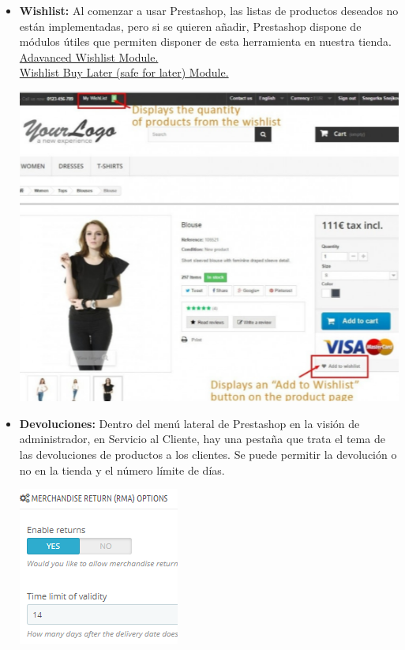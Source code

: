 \documentclass{article}
\begin{document}
\begin{itemize}
				\item[\triangleright] \textbf{Wishlist:} Al comenzar a usar Prestashop, las listas de productos deseados no están implementadas, pero si se quieren añadir, Prestashop dispone de módulos útiles que permiten disponer de esta herramienta en nuestra tienda.\\
				\href{https://addons.prestashop.com/en/wishlist-gift-card/26835-wishlist-buy-later-save-for-later.html?utm_source=back-office&utm_medium=push-addons&utm_campaign=back-office-EN&utm_content=download}{Adavanced Wishlist Module.}\\
				\href{https://addons.prestashop.com/en/wishlist-gift-card/26835-wishlist-buy-later-save-for-later.html?utm_source=back-office&utm_medium=push-addons&utm_campaign=back-office-EN&utm_content=download}{Wishlist Buy Later (safe for later) Module.}
				\begin{center}
				\includegraphics[scale=0.4]{images/wishlist.png}
				\end{center}				
			\end{itemize}
			
			\begin{itemize}
				\item[\triangleright] \textbf{Devoluciones:} Dentro del menú lateral de Prestashop en la visión de administrador, en Servicio al Cliente, hay una pestaña que trata el tema de las devoluciones de productos a los clientes. Se puede permitir la devolución o no en la tienda y el número límite de días.
				\begin{center}
				\includegraphics[scale=0.4]{images/devoluciones.png}
				\end{center}
			\end{itemize}
			
\end{document}
